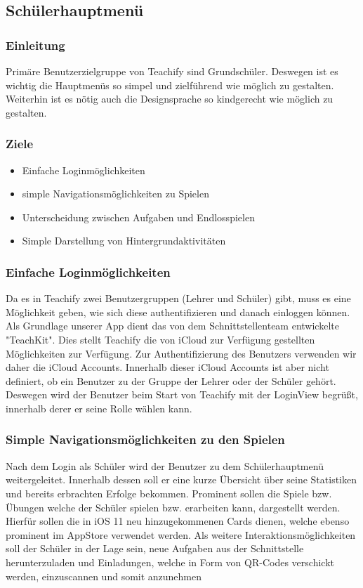 \subsection{Schülerhauptmenü}
\subsubsection{Einleitung}
Primäre Benutzerzielgruppe von Teachify sind Grundschüler. Deswegen ist es wichtig die Hauptmenüs so simpel und zielführend wie möglich zu gestalten. Weiterhin ist es nötig auch die Designsprache so kindgerecht wie möglich zu gestalten.

\subsubsection{Ziele}
\begin{itemize}
    \item Einfache Loginmöglichkeiten
    \item simple Navigationsmöglichkeiten zu Spielen
    \item Unterscheidung zwischen Aufgaben und Endlosspielen
    \item Simple Darstellung von Hintergrundaktivitäten
\end{itemize}

\subsubsection{Einfache Loginmöglichkeiten}
Da es in Teachify zwei Benutzergruppen (Lehrer und Schüler) gibt, muss es eine Möglichkeit geben, wie sich diese authentifizieren und danach einloggen können. Als Grundlage unserer App dient das von dem Schnittstellenteam entwickelte "TeachKit". Dies stellt Teachify die von iCloud zur Verfügung gestellten Möglichkeiten zur Verfügung. Zur Authentifizierung des Benutzers verwenden wir daher die iCloud Accounts. Innerhalb dieser iCloud Accounts ist aber nicht definiert, ob ein Benutzer zu der Gruppe der Lehrer oder der Schüler gehört. Deswegen wird der Benutzer beim Start von Teachify mit der LoginView begrüßt, innerhalb derer er seine Rolle wählen kann.

\subsubsection{Simple Navigationsmöglichkeiten zu den Spielen}
Nach dem Login als Schüler wird der Benutzer zu dem Schülerhauptmenü weitergeleitet. Innerhalb dessen soll er eine kurze Übersicht über seine Statistiken und bereits erbrachten Erfolge bekommen. Prominent sollen die Spiele bzw. Übungen welche der Schüler spielen bzw. erarbeiten kann, dargestellt werden. Hierfür sollen die in iOS 11 neu hinzugekommenen Cards dienen, welche ebenso prominent im AppStore verwendet werden. Als weitere Interaktionsmöglichkeiten soll der Schüler in der Lage sein, neue Aufgaben aus der Schnittstelle herunterzuladen und Einladungen, welche in Form von QR-Codes verschickt werden, einzuscannen und somit anzunehmen

